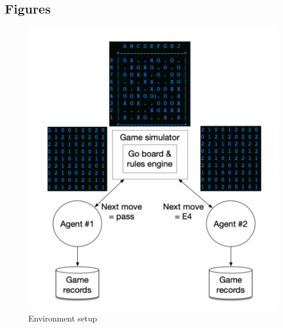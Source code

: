 \documentclass{article}
\begin{document}
\subsection{Figures}
\begin{figure}
\centering
\includegraphics[width=0.8\linewidth]{simulator}
\caption{Environment setup}
\label{fig:env}
\end{figure}

 
\end{document}
